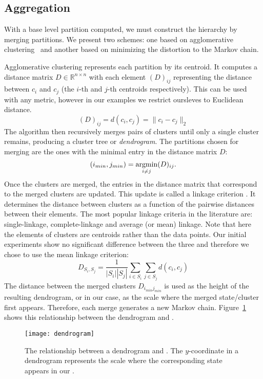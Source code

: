 \subsection{Aggregation}
\label{sec:state-aggregation-impl}

With a base level partition computed, we must construct the hierarchy by merging partitions. We present two schemes: one based on agglomerative clustering~\cite{Murtagh83} and another based on minimizing the distortion to the Markov chain. 

Agglomerative clustering represents each partition by its centroid. It computes a distance matrix $D \in \mathbb{R}^{n \times n}$ with each element $(D)_{ij}$ representing the distance between $c_i$ and $c_j$ (the $i$-th and $j$-th centroids respectively). This can be used with any metric, however in our examples we restrict oursleves to Euclidean distance.
\begin{equation}
	\nonumber
	(D)_{ij} = d(c_i, c_j) = \|c_i - c_j\|_2
\end{equation}
The algorithm then recursively merges pairs of clusters until only a single cluster remains, producing a cluster tree or \emph{dendrogram}. The partitions chosen for merging are the ones with the minimal entry in the distance matrix $D$:
\begin{equation}
	\nonumber
	(i_{min},j_{min}) = \argmin\limits_{i \neq j}(D)_{ij}.
\end{equation}
Once the clusters are merged, the entries in the distance matrix that correspond to the merged clusters are updated. This update is called a linkage criterion \cite{Hartigan:1975:CA:540298}. It determines the distance between clusters as a function of the pairwise distances between their elements. The most popular linkage criteria in the literature are: single-linkage, complete-linkage and average (or mean) linkage. Note that here the elements of clusters are centroids rather than the data points. 
Our initial experiments show no significant difference between the three and therefore we chose to use the mean linkage criterion:
\begin{equation}
	\nonumber
	D_{S_i,S_j} = \frac{1}{\left|S_i\right|\left|S_j\right|}\sum\limits_{i \in S_i}\sum\limits_{j \in S_j} d(c_i,c_j)
\end{equation}
The distance between the merged clusters $D_{i_{min} j_{min}}$ is used as the height of the resulting dendrogram, or in our case, as the scale where the merged state/cluster first appears. Therefore, each merge generates a new Markov chain. Figure~\ref{fig:dendrogram} shows this relationship between the dendrogram and .
\begin{figure}[h!]
	\centering
	\texttt{[image: dendrogram]}
	\caption{The relationship between a dendrogram and . The $y$-coordinate in a dendrogram represents the scale where the corresponding state appears in our .}
	\label{fig:dendrogram}
\end{figure}

